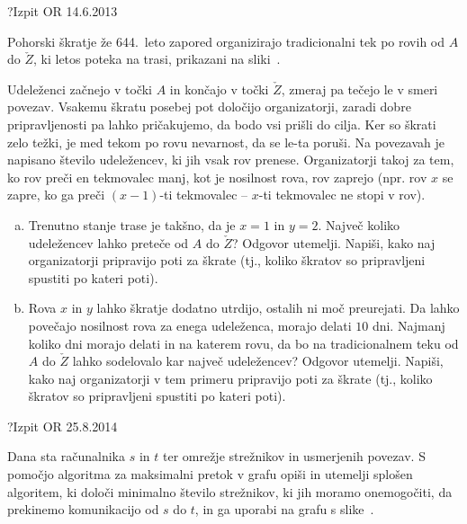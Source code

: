 \begin{naloga}{?}{Izpit OR 14.6.2013}
\begin{vprasanje}[rovi]
Pohorski škratje že 644.~leto zapored
organizirajo tradicionalni tek po rovih od $A$ do $\check{Z}$,
ki letos poteka na trasi, prikazani na sliki~\fig{}.

Udeleženci začnejo v točki $A$ in končajo v točki $\check{Z}$,
zmeraj pa tečejo le v smeri povezav.
Vsakemu škratu posebej pot določijo organizatorji,
zaradi dobre pripravljenosti pa lahko pričakujemo,
da bodo vsi prišli do cilja.
Ker so škrati zelo težki,
je med tekom po rovu nevarnost, da se le-ta poruši.
Na povezavah je napisano število udeležencev, ki jih vsak rov prenese.
Organizatorji takoj za tem, ko rov preči en tekmovalec manj,
kot je nosilnost rova, rov zaprejo
(npr. rov $x$ se zapre, ko ga preči $(x-1)$-ti tekmovalec
-- $x$-ti tekmovalec ne stopi v rov).

\begin{enumerate}[(a)]
\item Trenutno stanje trase je takšno, da je $x = 1$ in $y = 2$.
Največ koliko udeležencev lahko preteče od $A$ do $\check{Z}$?
Odgovor utemelji.
Napiši, kako naj organizatorji pripravijo poti za škrate
(tj., koliko škratov so pripravljeni spustiti po kateri poti).

\item Rova $x$ in $y$ lahko škratje dodatno utrdijo,
ostalih ni moč preurejati.
Da lahko povečajo nosilnost rova za enega udeleženca, morajo delati $10$ dni.
Najmanj koliko dni morajo delati in na katerem rovu,
da bo na tradicionalnem teku od $A$ do $\check{Z}$
lahko sodelovalo kar največ udeležencev?
Odgovor utemelji.
Napiši, kako naj organizatorji v tem primeru pripravijo poti za škrate
(tj., koliko škratov so pripravljeni spustiti po kateri poti).
\end{enumerate}

\begin{slika}
\pgfslika
{}
\end{slika}
\end{vprasanje}
\begin{odgovor}
\end{odgovor}
\end{naloga}


\begin{naloga}{?}{Izpit OR 25.8.2014}
\begin{vprasanje}[strezniki]
Dana sta računalnika $s$ in $t$ ter omrežje strežnikov
in usmerjenih povezav.
S pomočjo algoritma za maksimalni pretok v grafu
opiši in utemelji splošen algoritem,
ki določi minimalno število strežnikov, ki jih moramo onemogočiti,
da prekinemo komunikacijo od $s$ do $t$,
in ga uporabi na grafu s slike~\fig{}.

\begin{slika}
\pgfslika
{}
\end{slika}
\end{vprasanje}
\begin{odgovor}
\end{odgovor}
\end{naloga}


